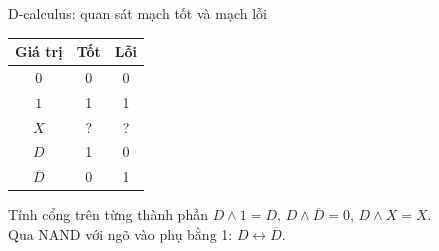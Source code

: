 \begin{frame}{D-calculus: quan sát mạch tốt và mạch lỗi}
\centering
\begin{tabular}{c|cc}
Giá trị & Tốt & Lỗi\\\hline
$0$ & 0 & 0\\
$1$ & 1 & 1\\
$X$ & ? & ?\\
$D$ & 1 & 0\\
$\overline D$ & 0 & 1
\end{tabular}
\begin{block}{Tính cổng trên từng thành phần}
$D\land1=D$, $D\land\overline D=0$, $D\land X=X$.\\
Qua NAND với ngõ vào phụ bằng 1: $D\leftrightarrow\overline D$.
\end{block}
\end{frame}

